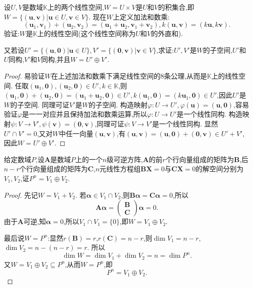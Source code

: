 \documentclass[lang=cn,newtx,10pt,scheme=chinese]{elegantbook}
\begin{document}
\begin{example}
设\(U,V\)是数域\(\mathbb{K}\)上的两个线性空间,\(W = U\times V\)是\(U\)和\(V\)的积集合,即\(W=\{(\boldsymbol{u},\boldsymbol{v})|\boldsymbol{u}\in U,\boldsymbol{v}\in V\}\). 现在\(W\)上定义加法和数乘:
\[
(\boldsymbol{u}_1,\boldsymbol{v}_1)+(\boldsymbol{u}_2,\boldsymbol{v}_2)=(\boldsymbol{u}_1+\boldsymbol{u}_2,\boldsymbol{v}_1+\boldsymbol{v}_2),k(\boldsymbol{u},\boldsymbol{v})=(k\boldsymbol{u},k\boldsymbol{v}).
\]
验证:\(W\)是\(\mathbb{K}\)上的线性空间(这个线性空间称为\(U\)和\(V\)的外直和).

又若设\(U'=\{(\boldsymbol{u},\boldsymbol{0})|\boldsymbol{u}\in U\},V'=\{(\boldsymbol{0},\boldsymbol{v})|\boldsymbol{v}\in V\}\),求证:\(U',V'\)是\(W\)的子空间,\(U'\)和\(U\)同构,\(V'\)和\(V\)同构,并且\(W = U'\oplus V'\).
\end{example}
\begin{proof}
    易验证\(W\)在上述加法和数乘下满足线性空间的8条公理,从而是\(\mathbb{K}\)上的线性空间. 任取\((\boldsymbol{u}_1,\boldsymbol{0}),(\boldsymbol{u}_2,\boldsymbol{0})\in U',k\in\mathbb{K}\),则\((\boldsymbol{u}_1,\boldsymbol{0})+(\boldsymbol{u}_2,\boldsymbol{0})=(\boldsymbol{u}_1+\boldsymbol{u}_2,\boldsymbol{0})\in U',k(\boldsymbol{u}_1,\boldsymbol{0})=(k\boldsymbol{u}_1,\boldsymbol{0})\in U'\),因此\(U'\)是\(W\)的子空间. 同理可证\(V'\)是\(W\)的子空间. 构造映射\(\varphi:U\to U',\varphi(\boldsymbol{u})=(\boldsymbol{u},\boldsymbol{0})\),容易验证\(\varphi\)是一一对应并且保持加法和数乘运算,所以\(\varphi:U\to U'\)是一个线性同构. 构造映射\(\psi:V\to V',\psi(\boldsymbol{v})=(\boldsymbol{0},\boldsymbol{v})\),同理可证\(\psi:V\to V'\)是一个线性同构. 显然\(U'\cap V' = 0\),又对\(W\)中任一向量\((\boldsymbol{u},\boldsymbol{v})\),有\((\boldsymbol{u},\boldsymbol{v})=(\boldsymbol{u},\boldsymbol{0})+(\boldsymbol{0},\boldsymbol{v})\in U'+V'\),因此\(W = U'\oplus V'\). 
\end{proof}

\begin{example}\label{example:561.16}
    给定数域\(P\),设\(\boldsymbol{A}\)是数域\(P\)上的一个\(n\)级可逆方阵,\(\boldsymbol{A}\)的前\(r\)个行向量组成的矩阵为\(\boldsymbol{B}\),后\(n - r\)个行向量组成的矩阵为\(\boldsymbol{C}\),\(n\)元线性方程组\(\boldsymbol{B}\boldsymbol{X}=0\)与\(\boldsymbol{C}\boldsymbol{X}=0\)的解空间分别为\(V_1,V_2\),证\(P^n = V_1\oplus V_2\).
\end{example}
\begin{proof}
    先记\(W = V_1 + V_2\). 若\(\boldsymbol{\alpha}\in V_1\cap V_2\),则\(\boldsymbol{B}\boldsymbol{\alpha}=\boldsymbol{C}\boldsymbol{\alpha}=0\),所以
\[
\boldsymbol{A}\boldsymbol{\alpha}=\begin{pmatrix}
\boldsymbol{B}\\
\boldsymbol{C}
\end{pmatrix}\boldsymbol{\alpha}=0.
\]
由于\(\boldsymbol{A}\)可逆,知\(\boldsymbol{\alpha}=0\),所以\(V_1\cap V_1 = \{0\}\),即\(W = V_1\oplus V_2\).

最后说\(W = P^n\):显然\(r(\boldsymbol{B}) = r\),\(r(\boldsymbol{C}) = n - r\),则\(\dim V_1 = n - r\),\(\dim V_2 = n-(n - r)=r\). 所以
\[
\dim W=\dim V_1+\dim V_2=n=\dim P^n.
\]
又\(W = V_1\oplus V_2\subseteq P^n\),从而\(W = P^n\),即
\[
P^n = V_1\oplus V_2.
\]  
\end{proof}
\end{document}
